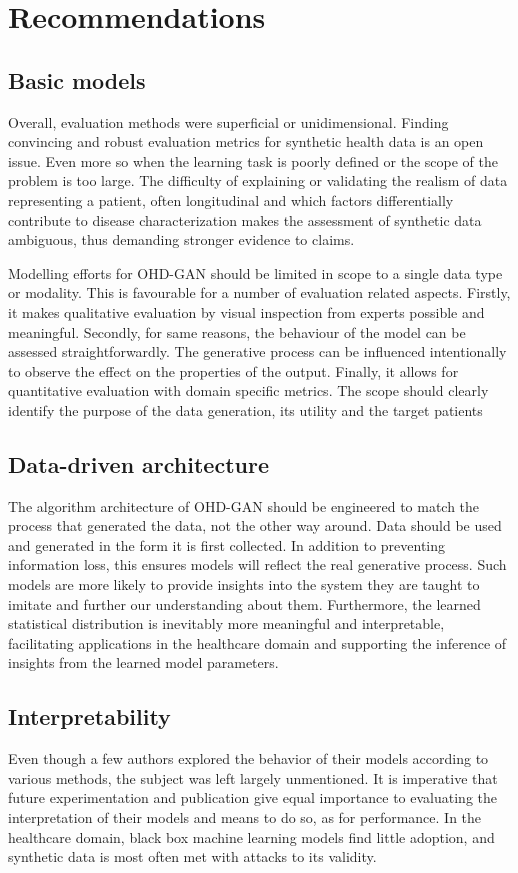 \section{Recommendations}\label{sec:recommend}
\subsection{Basic models}\label{sec:basic}

Overall, evaluation methods were superficial or unidimensional. Finding convincing and robust evaluation metrics for synthetic health data is an open issue. Even more so when the learning task is poorly defined or the scope of the problem is too large. The difficulty of explaining or validating the realism of data representing a patient, often longitudinal and which factors differentially contribute to disease characterization makes the assessment of synthetic data ambiguous, thus demanding stronger evidence to claims.\par
Modelling efforts for OHD-GAN should be limited in scope to a single data type or modality. This is favourable for a number of evaluation related aspects. Firstly, it makes qualitative evaluation by visual inspection from experts possible and meaningful. Secondly, for same reasons, the behaviour of the model can be assessed straightforwardly. The generative process can be influenced intentionally to observe the effect on the properties of the output. Finally, it allows for quantitative evaluation with domain specific metrics. The scope should clearly identify the purpose of the data generation, its utility and the target patients\cite{Capobianco2020,Kappen_2016, Kappen_2016a}

\subsection{Data-driven architecture}\label{sec:archi}
The algorithm architecture of OHD-GAN should be engineered to match the process that generated the data, not the other way around. Data should be used and generated in the form it is first collected. In addition to preventing information loss, this ensures models will reflect the real generative process. Such models are more likely to provide insights into the system they are taught to imitate and further our understanding about them. Furthermore, the learned statistical distribution is inevitably more meaningful and interpretable, facilitating applications in the healthcare domain and supporting the inference of insights from the learned model parameters.
\subsection{Interpretability}
Even though a few authors explored the behavior of their models according to various methods, the subject was left largely unmentioned. It is imperative that future experimentation and publication give equal importance to evaluating the interpretation of their models and means to do so, as for performance. In the healthcare domain, black box machine learning models find little adoption, and synthetic data is most often met with attacks to its validity.